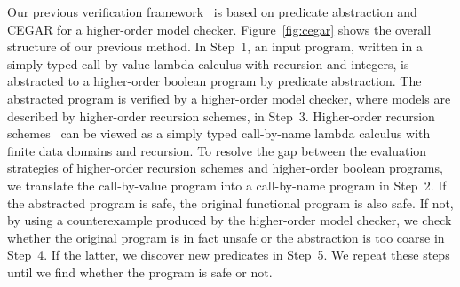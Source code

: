 Our previous verification framework~\cite{KobayashiPLDI2011} is based on
predicate abstraction and CEGAR for a higher-order model checker.
Figure~\ref{fig:cegar} shows the overall structure of our previous
method.  In Step~1, an input program, written in a simply typed
call-by-value lambda calculus with recursion and integers, is abstracted
to a higher-order boolean program by predicate abstraction.
The abstracted program is verified by a higher-order model checker,
where models are described by higher-order recursion schemes, in Step~3.
Higher-order recursion schemes~\cite{Ong2006} can be viewed as a simply typed
call-by-name lambda calculus with finite data domains and recursion.  To
resolve the gap between the evaluation strategies of higher-order
recursion schemes and higher-order boolean programs, we translate the
call-by-value program into a call-by-name program in Step~2. If the
abstracted program is safe, the original functional program is also
safe.  If not, by using a counterexample produced by the higher-order
model checker, we check whether the original program is in fact unsafe
or the abstraction is too coarse in Step~4. If the latter, we discover
new predicates in Step~5.  We repeat these steps until we find whether
the program is safe or not.

